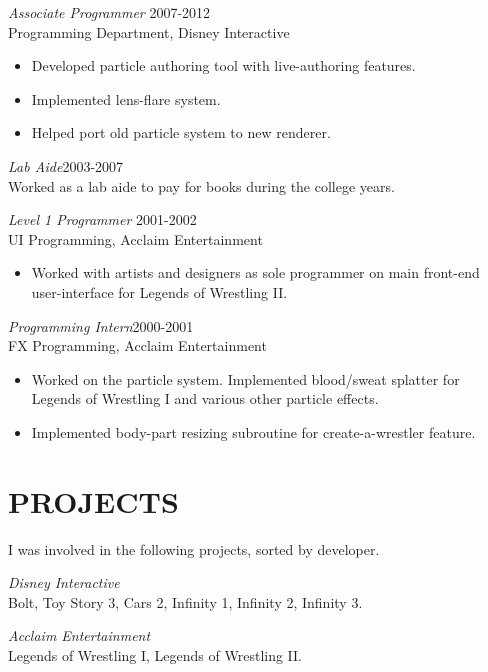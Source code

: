 \documentclass[margin]{res}
\begin{document}
\begin{resume}
                {\sl Associate Programmer} \hfill 2007-2012 \\
		Programming Department, Disney Interactive
                 \begin{itemize}  \itemsep -2pt %
		\item Developed particle authoring tool with live-authoring features.
		\item Implemented lens-flare system.
		\item Helped port old particle system to new renderer.
                 \end{itemize} 

		{\sl Lab Aide}\hfill 2003-2007 \\
		Worked as a lab aide to pay for books during the college years.

                {\sl Level 1 Programmer} \hfill 2001-2002 \\
		UI Programming, Acclaim Entertainment
                  \begin{itemize}\itemsep -2pt %
                   \item Worked with artists and designers as sole programmer on main front-end user-interface for Legends of Wrestling II.
                   \end{itemize} 

		{\sl Programming Intern}\hfill 2000-2001 \\
		FX Programming, Acclaim Entertainment
		\begin{itemize}\itemsep -2pt %
		\item Worked on the particle system.  Implemented blood/sweat splatter for Legends of Wrestling I and various other particle effects.
		\item Implemented body-part resizing subroutine for create-a-wrestler feature.
		\end{itemize}

\pagebreak

\section{PROJECTS}
		I was involved in the following projects, sorted by developer.
		
		{\sl Disney Interactive}\\
		Bolt, Toy Story 3, Cars 2, Infinity 1, Infinity 2, Infinity 3.

		{\sl Acclaim Entertainment}\\
		Legends of Wrestling I, Legends of Wrestling II.


\end{resume}
\end{document}
